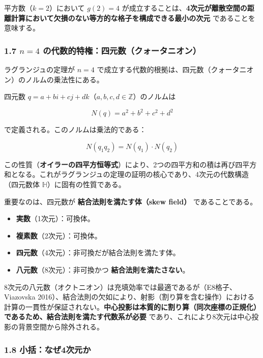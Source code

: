 \documentclass[a4paper,11pt]{ltjsarticle}
\providecommand{\tightlist}{\setlength{\itemsep}{0pt}\setlength{\parskip}{0pt}}
\begin{document}
平方数（\(k = 2\)）において \(g(2) = 4\)
が成立することは、\textbf{4次元が離散空間の距離計算において欠損のない等方的な格子を構成できる最小の次元}
であることを意味する。

\subsubsection{\texorpdfstring{1.7 \(n = 4\)
の代数的特権：四元数（クォータニオン）}{1.7 n = 4 の代数的特権：四元数（クォータニオン）}}\label{n-4-ux306eux4ee3ux6570ux7684ux7279ux6a29ux56dbux5143ux6570ux30afux30a9ux30fcux30bfux30cbux30aaux30f3}

ラグランジュの定理が \(n = 4\)
で成立する代数的根拠は、四元数（クォータニオン）のノルムの乗法性にある。

四元数
\(q = a + bi + cj + dk\)（\(a, b, c, d \in \mathbb{Z}\)）のノルムは

\[N(q) = a^2 + b^2 + c^2 + d^2\]

で定義される。このノルムは乗法的である：

\[N(q_1 q_2) = N(q_1) \cdot N(q_2)\]

この性質（\textbf{オイラーの四平方恒等式}）により、2つの四平方和の積は再び四平方和となる。これがラグランジュの定理の証明の核心であり、4次元の代数構造（四元数体
\(\mathbb{H}\)）に固有の性質である。

重要なのは、四元数が \textbf{結合法則を満たす体（skew field）}
であることである。

\begin{itemize}
\tightlist
\item
  \textbf{実数}（1次元）：可換体。
\item
  \textbf{複素数}（2次元）：可換体。
\item
  \textbf{四元数}（4次元）：非可換だが結合法則を満たす体。
\item
  \textbf{八元数}（8次元）：非可換かつ \textbf{結合法則を満たさない}。
\end{itemize}

8次元の八元数（オクトニオン）は充填効率では最適であるが（E8格子、Viazovska
2016）、結合法則の欠如により、射影（割り算を含む操作）における計算の一貫性が保証されない。\textbf{中心投影は本質的に割り算（同次座標の正規化）であるため、結合法則を満たす代数系が必要}
であり、これにより8次元は中心投影の背景空間から除外される。

\subsubsection{1.8
小括：なぜ4次元か}\label{ux5c0fux62ecux306aux305c4ux6b21ux5143ux304b}
\end{document}
